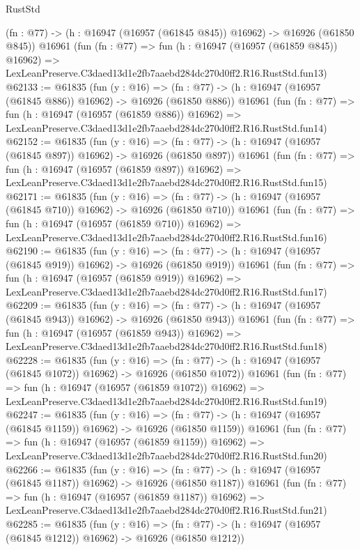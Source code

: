 \begin{lexlean}{RustStd}
\begin{coremodule}
    (fn : @77) -> (h : @16947 (@16957 (@61845 @845)) @16962) -> @16926 (@61850 @845))
    @16961
    (fun (fn : @77) =>
    fun (h : @16947 (@16957 (@61859 @845)) @16962) =>
    LexLeanPreserve.C3daed13d1e2fb7aaebd284dc270d0ff2.R16.RustStd.fun13)
@62133 := @61835
    (fun (y : @16) =>
    (fn : @77) -> (h : @16947 (@16957 (@61845 @886)) @16962) -> @16926 (@61850 @886))
    @16961
    (fun (fn : @77) =>
    fun (h : @16947 (@16957 (@61859 @886)) @16962) =>
    LexLeanPreserve.C3daed13d1e2fb7aaebd284dc270d0ff2.R16.RustStd.fun14)
@62152 := @61835
    (fun (y : @16) =>
    (fn : @77) -> (h : @16947 (@16957 (@61845 @897)) @16962) -> @16926 (@61850 @897))
    @16961
    (fun (fn : @77) =>
    fun (h : @16947 (@16957 (@61859 @897)) @16962) =>
    LexLeanPreserve.C3daed13d1e2fb7aaebd284dc270d0ff2.R16.RustStd.fun15)
@62171 := @61835
    (fun (y : @16) =>
    (fn : @77) -> (h : @16947 (@16957 (@61845 @710)) @16962) -> @16926 (@61850 @710))
    @16961
    (fun (fn : @77) =>
    fun (h : @16947 (@16957 (@61859 @710)) @16962) =>
    LexLeanPreserve.C3daed13d1e2fb7aaebd284dc270d0ff2.R16.RustStd.fun16)
@62190 := @61835
    (fun (y : @16) =>
    (fn : @77) -> (h : @16947 (@16957 (@61845 @919)) @16962) -> @16926 (@61850 @919))
    @16961
    (fun (fn : @77) =>
    fun (h : @16947 (@16957 (@61859 @919)) @16962) =>
    LexLeanPreserve.C3daed13d1e2fb7aaebd284dc270d0ff2.R16.RustStd.fun17)
@62209 := @61835
    (fun (y : @16) =>
    (fn : @77) -> (h : @16947 (@16957 (@61845 @943)) @16962) -> @16926 (@61850 @943))
    @16961
    (fun (fn : @77) =>
    fun (h : @16947 (@16957 (@61859 @943)) @16962) =>
    LexLeanPreserve.C3daed13d1e2fb7aaebd284dc270d0ff2.R16.RustStd.fun18)
@62228 := @61835
    (fun (y : @16) =>
    (fn : @77) -> (h : @16947 (@16957 (@61845 @1072)) @16962) -> @16926 (@61850 @1072))
    @16961
    (fun (fn : @77) =>
    fun (h : @16947 (@16957 (@61859 @1072)) @16962) =>
    LexLeanPreserve.C3daed13d1e2fb7aaebd284dc270d0ff2.R16.RustStd.fun19)
@62247 := @61835
    (fun (y : @16) =>
    (fn : @77) -> (h : @16947 (@16957 (@61845 @1159)) @16962) -> @16926 (@61850 @1159))
    @16961
    (fun (fn : @77) =>
    fun (h : @16947 (@16957 (@61859 @1159)) @16962) =>
    LexLeanPreserve.C3daed13d1e2fb7aaebd284dc270d0ff2.R16.RustStd.fun20)
@62266 := @61835
    (fun (y : @16) =>
    (fn : @77) -> (h : @16947 (@16957 (@61845 @1187)) @16962) -> @16926 (@61850 @1187))
    @16961
    (fun (fn : @77) =>
    fun (h : @16947 (@16957 (@61859 @1187)) @16962) =>
    LexLeanPreserve.C3daed13d1e2fb7aaebd284dc270d0ff2.R16.RustStd.fun21)
@62285 := @61835
    (fun (y : @16) =>
    (fn : @77) -> (h : @16947 (@16957 (@61845 @1212)) @16962) -> @16926 (@61850 @1212))

\end{coremodule}
\end{lexlean}
